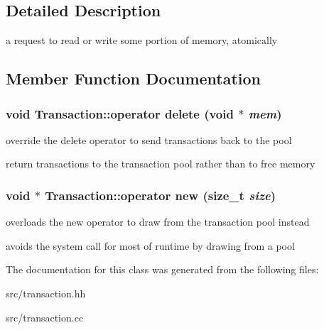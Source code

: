\subsection{Detailed Description}
a request to read or write some portion of memory, atomically 

\subsection{Member Function Documentation}
\subsubsection[{operator delete}]{\setlength{\rightskip}{0pt plus 5cm}void Transaction::operator delete (void $\ast$ {\em mem})}\label{class_d_r_a_msim_i_i_1_1_transaction_a4161098bb071135f21c2a7f95a6d5580}


override the delete operator to send transactions back to the pool 

return transactions to the transaction pool rather than to free memory 
\subsubsection[{operator new}]{\setlength{\rightskip}{0pt plus 5cm}void $\ast$ Transaction::operator new (size\_\-t {\em size})}\label{class_d_r_a_msim_i_i_1_1_transaction_ad2b57bb609cc842f92e4319c555d3bf1}


overloads the new operator to draw from the transaction pool instead 

avoids the system call for most of runtime by drawing from a pool 

The documentation for this class was generated from the following files:\begin{DoxyCompactItemize}
\item 
src/transaction.hh\item 
src/transaction.cc\end{DoxyCompactItemize}
